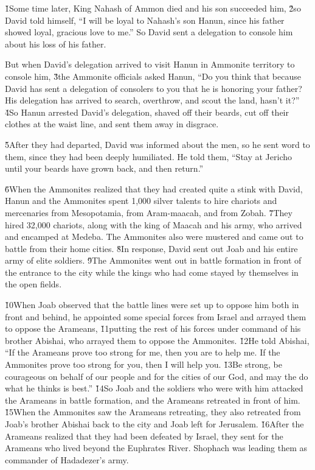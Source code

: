 \v{1}Some time later, King Nahash of Ammon died and his son succeeded him, \v{2}so David told himself, ``I will be loyal to Nahash's son Hanun, since his father showed loyal, gracious love to me.'' So David sent a delegation to console him about his loss of his father.

But when David's delegation arrived to visit Hanun in Ammonite territory to console him, \v{3}the Ammonite officials asked Hanun, ``Do you think that because David has sent a delegation of consolers to you that he is honoring your father? His delegation has arrived to search, overthrow, and scout the land, hasn't it?'' \v{4}So Hanun arrested David's delegation, shaved off their beards, cut off their clothes at the waist line, and sent them away in disgrace.

\v{5}After they had departed, David was informed about the men, so he sent word to them, since they had been deeply humiliated. He told them, ``Stay at Jericho until your beards have grown back, and then return.''

\v{6}When the Ammonites realized that they had created quite a stink with David, Hanun and the Ammonites spent 1,000 silver talents to hire chariots and mercenaries from Mesopotamia, from Aram-maacah, and from Zobah. \v{7}They hired 32,000 chariots, along with the king of Maacah and his army, who arrived and encamped at Medeba. The Ammonites also were mustered and came out to battle from their home cities. \v{8}In response, David sent out Joab and his entire army of elite soldiers. \v{9}The Ammonites went out in battle formation in front of the entrance to the city while the kings who had come stayed by themselves in the open fields.

\v{10}When Joab observed that the battle lines were set up to oppose him both in front and behind, he appointed some special forces from Israel and arrayed them to oppose the Arameans, \v{11}putting the rest of his forces under command of his brother Abishai, who arrayed them to oppose the Ammonites. \v{12}He told Abishai, ``If the Arameans prove too strong for me, then you are to help me. If the Ammonites prove too strong for you, then I will help you. \v{13}Be strong, be courageous on behalf of our people and for the cities of our God, and may the  do what he thinks is best.'' \v{14}So Joab and the soldiers who were with him attacked the Arameans in battle formation, and the Arameans retreated in front of him. \v{15}When the Ammonites saw the Arameans retreating, they also retreated from Joab's brother Abishai back to the city and Joab left for Jerusalem. \v{16}After the Arameans realized that they had been defeated by Israel, they sent for the Arameans who lived beyond the Euphrates River. Shophach was leading them as commander of Hadadezer's army.

